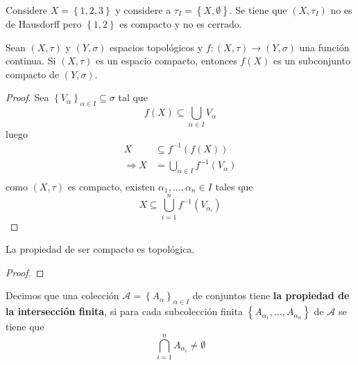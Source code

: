 \documentclass[12pt]{report}
\theoremstyle{largebreak}
\newcommand\cf[3]{\ensuremath{#1:#2\rightarrow#3}}
\begin{document}
    \begin{exa}
        Considere $X=\left\{1,2,3 \right\}$ y considere a $\tau_I=\left\{X,\emptyset \right\}$. Se tiene que $(X,\tau_I)$ no es de Hausdorff pero $\left\{1,2\right\}$ es compacto y no es cerrado.
    \end{exa}

    \begin{propo}
        Sean $(X,\tau)$ y $(Y,\sigma)$ espacios topológicos y $\cf{f}{(X,\tau)}{(Y,\sigma)}$ una función continua. Si $(X,\tau)$ es un espacio compacto, entonces $f(X)$ es un subconjunto compacto de $(Y,\sigma)$.
    \end{propo}
    
    \begin{proof}
        Sea $\left\{V_\alpha \right\}_{\alpha\in I}\subseteq\sigma$ tal que
        \begin{equation*}
            f(X)\subseteq\bigcup_{\alpha\in I}V_\alpha
        \end{equation*}
        luego
        \begin{equation*}
            \begin{split}
                X&\subseteq f^{-1}(f(X))\\
                \Rightarrow X&=\bigcup_{\alpha\in I}f^{-1}(V_\alpha)\\
            \end{split}
        \end{equation*}
        como $(X,\tau)$ es compacto, existen $\alpha_1,...,\alpha_n\in I$ tales que
        \begin{equation*}
            X\subseteq\bigcup_{i=1}^n f^{-1}(V_{\alpha_i})
        \end{equation*}
    \end{proof}

    \begin{cor}
        La propiedad de ser compacto es topológica.
    \end{cor}

    \begin{proof}
        
    \end{proof}

    \begin{mydef}
        Decimos que una colección $\mathcal{A}=\left\{A_{\alpha} \right\}_{\alpha\in I}$ de conjuntos tiene \textbf{la propiedad de la intersección finita}, si para cada subcolección finita $\left\{A_{\alpha_1},...,A_{\alpha_n} \right\}$ de $\mathcal{A}$ se tiene que
        \begin{equation*}
            \bigcap_{ i=1}^n A_{ \alpha_i}\neq\emptyset
        \end{equation*}
    \end{mydef}
\end{document}
